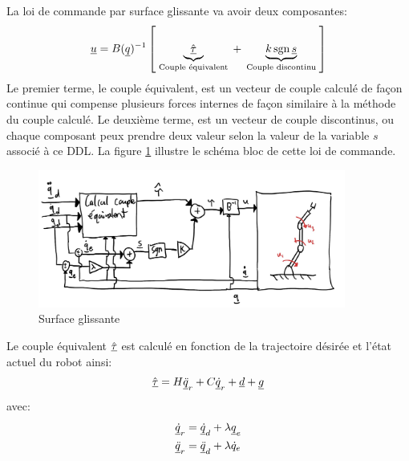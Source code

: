 La loi de commande par surface glissante va avoir deux composantes:
\begin{align}
\underline{u} = 
B(\underline{q})^{-1} \left[
\underbrace{
\hat{\underline{\tau}} 
}_{\text{ Couple équivalent }}
+ 
\underbrace{
k \operatorname{sgn}{ \underline{s} }
}_{\text{ Couple discontinu }}
\right]
\end{align}
Le premier terme, le couple équivalent, est un vecteur de couple calculé de façon continue qui compense plusieurs forces internes de façon similaire à la méthode du couple calculé. Le deuxième terme, est un vecteur de couple discontinus, ou chaque composant peux prendre deux valeur selon la valeur de la variable $s$ associé à ce DDL. La figure \ref{fig:slidingmode_bloc} illustre le schéma bloc de cette loi de commande.
\begin{figure}[htp]
	\centering
		\includegraphics[width=0.90\textwidth]{fig/slidingmode_bloc.jpeg}
	\caption{Surface glissante}
	\label{fig:slidingmode_bloc}
\end{figure}
Le couple équivalent $\hat{\underline{\tau}}$ est calculé en fonction de la trajectoire désirée et l'état actuel du robot ainsi:
\begin{align}
\hat{\underline{\tau}} = H \underline{\ddot{q}}_r + C \underline{\dot{q}}_r + \underline{d} +  \underline{g}
\end{align}
avec:
\begin{align}
\underline{\dot{q}}_r &= \underline{\dot{q}}_d + \lambda \underline{q}_e \\
 \underline{\ddot{q}}_r &= \underline{\ddot{q}}_d + \lambda \dot{q}_e \\
\end{align}

